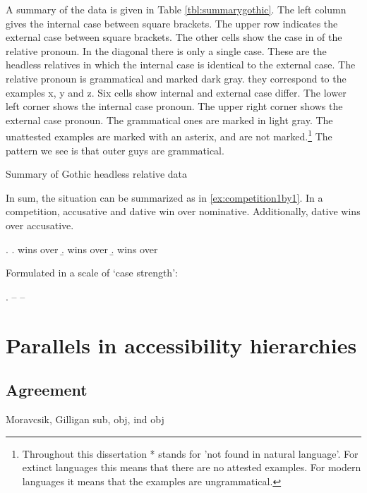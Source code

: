 A summary of the data is given in Table \ref{tbl:summarygothic}. The left column gives the internal case between square brackets. The upper row indicates the external case between square brackets.
The other cells show the case in of the relative pronoun. In the diagonal there is only a single case. These are the headless relatives in which the internal case is identical to the external case. The relative pronoun is grammatical and marked dark gray. they correspond to the examples x, y and z.
Six cells show internal and external case differ. The lower left corner shows the internal case pronoun. The upper right corner shows the external case pronoun. The grammatical ones are marked in light gray. The unattested examples are marked with an asterix, and are not marked.\footnote{
Throughout this dissertation * stands for 'not found in natural language'. For extinct languages this means that there are no attested examples. For modern languages it means that the examples are ungrammatical.
}
The pattern we see is that outer guys are grammatical.


\begin{table}[H]
  \center
  \caption {Summary of Gothic headless relative data}
    
    \label{tbl:summarygothic}
\end{table}


In sum, the situation can be summarized as in \ref{ex:competition1by1}. In a competition, accusative and dative win over nominative. Additionally, dative wins over accusative.

\ex.\label{ex:competition1by1}
\a.  wins over 
\b.  wins over 
\b.  wins over 

Formulated in a scale of `case strength':

\ex.  --  -- \label{ex:casestrength}




\section{Parallels in accessibility hierarchies}



\subsection{Agreement}

Moravcsik, Gilligan sub, obj, ind obj

